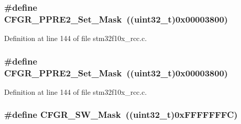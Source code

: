 \subsubsection[{\texorpdfstring{C\+F\+G\+R\+\_\+\+P\+P\+R\+E2\+\_\+\+Set\+\_\+\+Mask}{CFGR_PPRE2_Set_Mask}}]{\setlength{\rightskip}{0pt plus 5cm}\#define C\+F\+G\+R\+\_\+\+P\+P\+R\+E2\+\_\+\+Set\+\_\+\+Mask~(({\bf uint32\+\_\+t})0x00003800)}\hypertarget{group___r_c_c___private___defines_ga63883951c986cf6dc1d6a8775f821af7}{}\label{group___r_c_c___private___defines_ga63883951c986cf6dc1d6a8775f821af7}


Definition at line 144 of file stm32f10x\+\_\+rcc.\+c.

\subsubsection[{\texorpdfstring{C\+F\+G\+R\+\_\+\+P\+P\+R\+E2\+\_\+\+Set\+\_\+\+Mask}{CFGR_PPRE2_Set_Mask}}]{\setlength{\rightskip}{0pt plus 5cm}\#define C\+F\+G\+R\+\_\+\+P\+P\+R\+E2\+\_\+\+Set\+\_\+\+Mask~(({\bf uint32\+\_\+t})0x00003800)}\hypertarget{group___r_c_c___private___defines_ga63883951c986cf6dc1d6a8775f821af7}{}\label{group___r_c_c___private___defines_ga63883951c986cf6dc1d6a8775f821af7}


Definition at line 144 of file stm32f10x\+\_\+rcc.\+c.

\subsubsection[{\texorpdfstring{C\+F\+G\+R\+\_\+\+S\+W\+\_\+\+Mask}{CFGR_SW_Mask}}]{\setlength{\rightskip}{0pt plus 5cm}\#define C\+F\+G\+R\+\_\+\+S\+W\+\_\+\+Mask~(({\bf uint32\+\_\+t})0x\+F\+F\+F\+F\+F\+F\+F\+C)}\hypertarget{group___r_c_c___private___defines_ga41e0b286664f76c2057cffb134809c51}{}\label{group___r_c_c___private___defines_ga41e0b286664f76c2057cffb134809c51}



